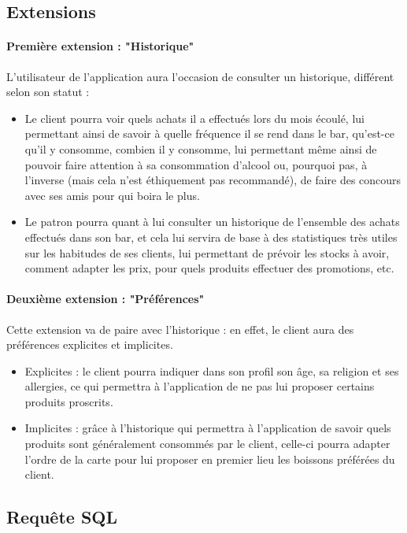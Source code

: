 \documentclass[11pt, a4, oneside, headings=normal]{scrreprt}
\begin{document}
\subsection*{Extensions}

\paragraph{Première extension : "Historique"}
L'utilisateur de l'application aura l'occasion de consulter un historique, différent selon son statut :
\begin{itemize}
\item Le client pourra voir quels achats il a effectués lors du mois écoulé, lui permettant ainsi de savoir à quelle fréquence il se rend dans le bar, qu'est-ce qu'il y consomme, combien il y consomme, lui permettant même ainsi de pouvoir faire attention à sa consommation d'alcool ou, pourquoi pas, à l'inverse (mais cela n'est éthiquement pas recommandé), de faire des concours avec ses amis pour qui boira le plus.

\item Le patron pourra quant à lui consulter un historique de l'ensemble des achats effectués dans son bar, et cela lui servira de base à des statistiques très utiles sur les habitudes de ses clients, lui permettant de prévoir les stocks à avoir, comment adapter les prix, pour quels produits effectuer des promotions, etc.
\end{itemize}

\paragraph{Deuxième extension : "Préférences"}
Cette extension va de paire avec l'historique : en effet, le client aura des préférences explicites et implicites.
\begin{itemize}
\item Explicites : le client pourra indiquer dans son profil son âge, sa religion et ses allergies, ce qui permettra à l'application de ne pas lui proposer certains produits proscrits.
\item Implicites : grâce à l'historique qui permettra à l'application de savoir quels produits sont généralement consommés par le client, celle-ci pourra adapter l'ordre de la carte pour lui proposer en premier lieu les boissons préférées du client.
\end{itemize}

\subsection*{Requête SQL}
\end{document}
